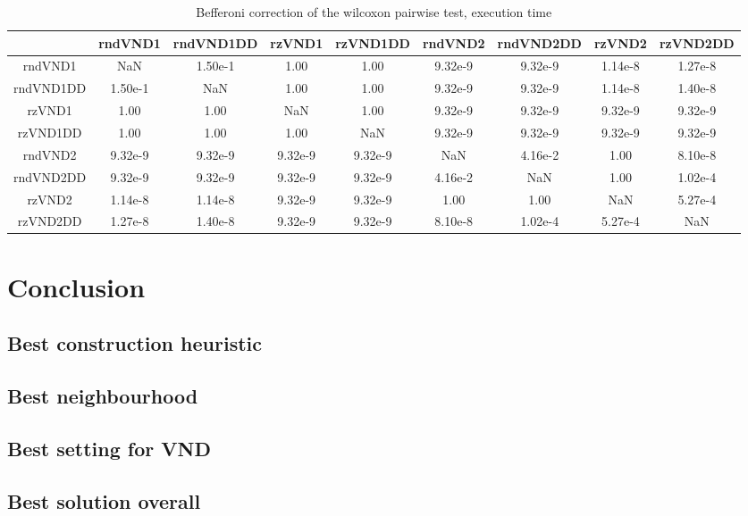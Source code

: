 \documentclass[12pt,a4paper]{article}
\begin{document}
\begin{table}[!h]
\leftskip -1.6cm
{
\footnotesize
\begin{tabular}{|*{9}{c|}}
  \hline
	 & rndVND1 & rndVND1DD & rzVND1 & rzVND1DD & rndVND2 & rndVND2DD & rzVND2 & rzVND2DD \\
  \hline
	rndVND1 & NaN & 1.50e-1 & 1.00 & 1.00 & 9.32e-9 & 9.32e-9 & 1.14e-8 & 1.27e-8 \\
	rndVND1DD & 1.50e-1 & NaN & 1.00 & 1.00 & 9.32e-9 & 9.32e-9 & 1.14e-8 & 1.40e-8 \\
	rzVND1 & 1.00 & 1.00 & NaN & 1.00 & 9.32e-9 & 9.32e-9 & 9.32e-9 & 9.32e-9 \\
	rzVND1DD & 1.00 & 1.00 & 1.00 & NaN & 9.32e-9 & 9.32e-9 & 9.32e-9 & 9.32e-9 \\
	rndVND2 & 9.32e-9 & 9.32e-9 & 9.32e-9 & 9.32e-9 & NaN & 4.16e-2 & 1.00 & 8.10e-8 \\
	rndVND2DD & 9.32e-9 & 9.32e-9 & 9.32e-9 & 9.32e-9 & 4.16e-2 & NaN & 1.00 & 1.02e-4 \\
	rzVND2 & 1.14e-8 & 1.14e-8 & 9.32e-9 & 9.32e-9 & 1.00 & 1.00 & NaN & 5.27e-4 \\
	rzVND2DD & 1.27e-8 & 1.40e-8 & 9.32e-9 & 9.32e-9 & 8.10e-8 & 1.02e-4 & 5.27e-4 & NaN \\
  \hline
\end{tabular}
\normalsize
}
\caption{Befferoni correction of the wilcoxon pairwise test, execution time}
\label{Befferoni correction of the wilcoxon pairwise test VND time}
\end{table} 
 
\section{Conclusion}

\subsection{Best construction heuristic}

\subsection{Best neighbourhood}

\subsection{Best setting for VND}

\subsection{Best solution overall}
\end{document}
